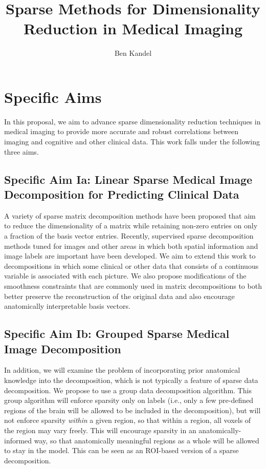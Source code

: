 \documentclass[11pt]{nih}
\date{}
\author{Ben Kandel}
\title{Sparse Methods for Dimensionality Reduction in Medical Imaging}
\begin{document}
\maketitle

\section*{Specific Aims}
In this proposal, we aim to advance sparse dimensionality reduction techniques in medical imaging to provide more accurate and robust correlations between imaging and cognitive and other clinical data.  This work falls under the following three aims. 
 
\subsection*{Specific Aim Ia:  Linear Sparse Medical Image Decomposition for Predicting Clinical Data} 
A variety of sparse matrix decomposition methods have been proposed that aim to reduce the dimensionality of a matrix while retaining non-zero entries on only a fraction of the basis vector entries.   Recently, supervised sparse decomposition methods tuned for images and other areas in which both spatial information and image labels are important have been developed.  We aim to extend this work to decompositions in which some clinical or other data that consists of a continuous variable is associated with each picture.  We also propose modifications of the smoothness constraints that are commonly used in matrix decompositions to both better preserve the reconstruction of the original data and also encourage anatomically interpretable basis vectors.  
\subsection*{Specific Aim Ib: Grouped Sparse Medical Image Decomposition}
In addition, we will examine the problem of incorporating prior anatomical knowledge into the decomposition, which is not typically a feature of sparse data decomposition.  We propose to use a group data decomposition algorithm.  This group algorithm will enforce sparsity only on labels (i.e., only a few pre-defined regions of the brain will be allowed to be included in the decomposition), but will not enforce sparsity \textit{within} a given region, so that within a region, all voxels of the region may vary freely.  This will encourage sparsity in an anatomically-informed way, so that anatomically meaningful regions as a whole will be allowed to stay in the model.  This can be seen as an ROI-based version of a sparse decomposition.
\end{document}
